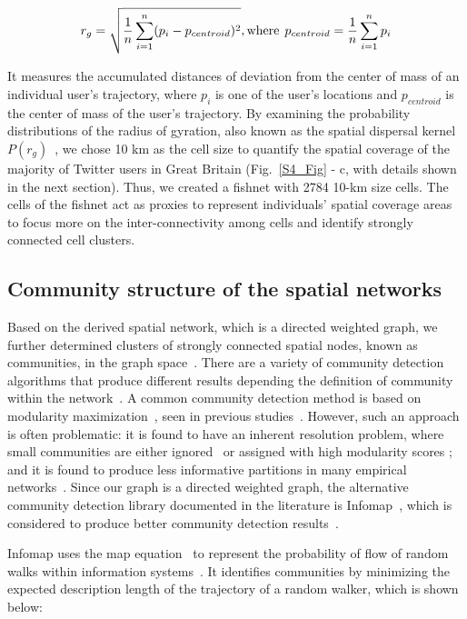 \documentclass[10pt,letterpaper]{article}
\begin{document}
\begin{equation} \label{eq:2}
r_{g} = \sqrt{\frac{1}{n}\sum_{i=1}^{n}(p_{i} -  p_{centroid})^{2}}, \textrm{where}\hspace{1ex} p_{centroid} = \frac{1}{n}\sum_{i=1}^{n}p_{i}
\end{equation}

\noindent It measures the accumulated distances of deviation from the center of mass of an individual user's trajectory, where $p_{i}$ is one of the user's locations and $p_{centroid}$ is the center of mass of the user's trajectory.
By examining the probability distributions of the radius of gyration, also known as the spatial dispersal kernel $P(r_g)$~\cite{brockmann2006}, we chose 10 km as the cell size to quantify the spatial coverage of the majority of Twitter users in Great Britain (Fig.~\ref{S4_Fig} - c, with details shown in the next section). 
Thus, we created a fishnet with 2784 10-km size cells.
The cells of the fishnet act as proxies to represent individuals' spatial coverage areas to focus more on the inter-connectivity among cells and identify strongly connected cell clusters. 

\subsection*{Community structure of the spatial networks}
Based on the derived spatial network, which is a directed weighted graph, we further determined clusters of strongly connected spatial nodes, known as communities, in the graph space~\cite{coscia2011}. 
There are a variety of community detection algorithms that produce different results depending the definition of community within the network~\cite{coscia2011}.
A common community detection method is based on modularity maximization~\cite{newman2006}, seen in previous studies~\cite{hawelka,ratti2010,song2012}.
However, such an approach is often problematic: it is found to have an inherent resolution problem, where small communities are either ignored~\cite{fortunato2007} or assigned with high modularity scores \cite{guimera2004}; and it is found to produce less informative partitions in many empirical networks~\cite{good2010}.
Since our graph is a directed weighted graph, the alternative community detection library documented in the literature is Infomap~\cite{domenico2015,rosvall2008}, which is considered to produce better community detection results~\cite{lancichinetti2009}.

Infomap uses the map equation~\cite{rosvall2010} to represent the probability of flow of random walks within information systems~\cite{rosvall2008}.
It identifies communities by minimizing the expected description length of the trajectory of a random walker, which is shown below:
\end{document}
